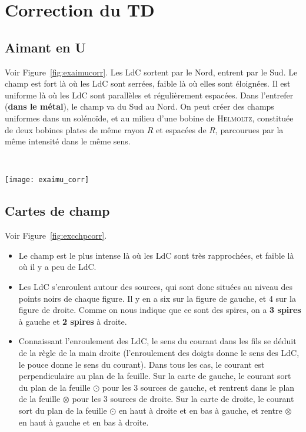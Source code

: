 \documentclass[a4paper, 11pt, final, garamond]{book}
\begin{document}

\chapter{Correction du TD}

\section{Aimant en U}
\label{sec:exaimu}
\noindent
\begin{minipage}[t]{.5\linewidth}
  Voir Figure~\ref{fig:exaimucorr}. Les LdC sortent par le Nord, entrent par le
  Sud. Le champ est fort là où les LdC sont serrées, faible là où elles sont
  éloignées. Il est uniforme là où les LdC sont parallèles et régulièrement
  espacées. Dans l'entrefer (\textbf{dans le métal}), le champ va du Sud au
  Nord.
  \bigbreak
  On peut créer des champs uniformes dans un solénoïde, et au milieu d'une
  bobine de \textsc{Helmoltz}, constituée de deux bobines plates de même rayon
  $R$ et espacées de $R$, parcourues par la même intensité dans le même sens.
\end{minipage}
\begin{minipage}[t]{.5\linewidth}
  ~
  \vspace*{-10pt}
  \begin{center}
    \texttt{[image: exaimu\_corr]}
    \label{fig:exaimucorr}
  \end{center}
\end{minipage}

\section{Cartes de champ}
\label{sec:excchp}
Voir Figure~\ref{fig:excchpcorr}.
\begin{itemize}[label=$\diamond$, leftmargin=10pt]
  \item Le champ est le plus intense là où les LdC sont très rapprochées, et
    faible là où il y a peu de LdC.
  \item Les LdC s'enroulent autour des sources, qui sont donc situées au niveau
    des points noirs de chaque figure. Il y en a six sur la figure de gauche, et
    4 sur la figure de droite. Comme on nous indique que ce sont des spires, on
    a \textbf{3 spires} à gauche et \textbf{2 spires} à droite.
  \item Connaissant l'enroulement des LdC, le sens du courant dans les fils se
    déduit de la règle de la main droite (l'enroulement des doigts donne le sens
    des LdC, le pouce donne le sens du courant). Dans tous les cas, le courant
    est perpendiculaire au plan de la feuille.
    \smallbreak
    Sur la carte de gauche, le courant sort du plan de la feuille $\odot$ pour
    les 3 sources de gauche, et rentrent dans le plan de la feuille $\otimes$
    pour les 3 sources de droite.
    \smallbreak
    Sur la carte de droite, le courant sort du plan de la feuille $\odot$ en haut à
    droite et en bas à gauche, et rentre $\otimes$ en haut à gauche et en bas à
    droite.
\end{itemize}
\end{document}
